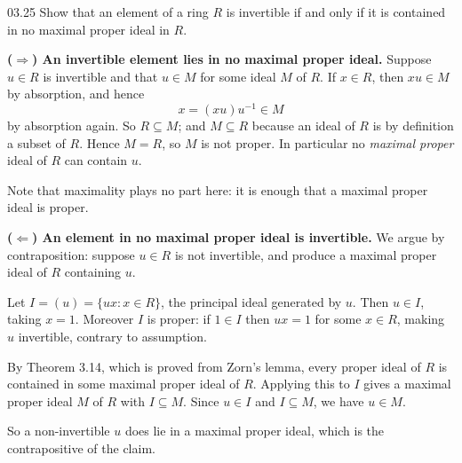 \documentclass[11pt]{article}
\begin{document}
\begin{problem}{03.25}
  Show that an element of a ring $R$ is invertible if and only if it is
  contained in no maximal proper ideal in $R$.
\end{problem}
\begin{solution}
  \textbf{($\Rightarrow$) An invertible element lies in no maximal proper
  ideal.} Suppose $u \in R$ is invertible and that $u \in M$ for some ideal $M$
  of $R$. If $x \in R$, then $xu \in M$ by absorption, and hence
  \[
    x = (xu)u^{-1} \in M
  \]
  by absorption again. So $R \subseteq M$; and $M \subseteq R$ because an ideal
  of $R$ is by definition a subset of $R$. Hence $M = R$, so $M$ is not proper.
  In particular no \emph{maximal proper} ideal of $R$ can contain $u$.

  Note that maximality plays no part here: it is enough that a maximal proper
  ideal is proper.

  \medskip
  \textbf{($\Leftarrow$) An element in no maximal proper ideal is invertible.}
  We argue by contraposition: suppose $u \in R$ is not invertible, and produce
  a maximal proper ideal of $R$ containing $u$.

  Let $I = (u) = \{ ux : x \in R \}$, the principal ideal generated by $u$.
  Then $u \in I$, taking $x = 1$. Moreover $I$ is proper: if $1 \in I$ then
  $ux = 1$ for some $x \in R$, making $u$ invertible, contrary to assumption.

  By Theorem 3.14, which is proved from Zorn's lemma, every proper ideal of $R$
  is contained in some maximal proper ideal of $R$. Applying this to $I$ gives a
  maximal proper ideal $M$ of $R$ with $I \subseteq M$. Since $u \in I$ and
  $I \subseteq M$, we have $u \in M$.

  So a non-invertible $u$ does lie in a maximal proper ideal, which is the
  contrapositive of the claim.
\end{solution}
\end{document}
